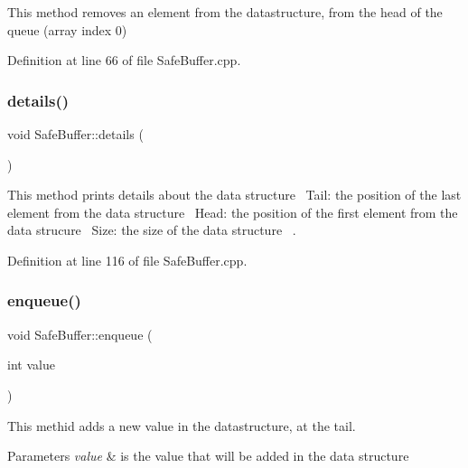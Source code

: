 This method removes an element from the datastructure, from the head of the queue (array index 0) 



Definition at line 66 of file Safe\+Buffer.\+cpp.

\mbox{\label{classSafeBuffer_affaee5f2062b85d8a95379b7e66e1549}} 
\subsubsection{\texorpdfstring{details()}{details()}}
{\footnotesize\ttfamily void Safe\+Buffer\+::details (\begin{DoxyParamCaption}{ }\end{DoxyParamCaption})}



This method prints details about the data structure~\newline
 Tail\+: the position of the last element from the data structure~\newline
 Head\+: the position of the first element from the data strucure~\newline
 Size\+: the size of the data structure~\newline
. 



Definition at line 116 of file Safe\+Buffer.\+cpp.

\mbox{\label{classSafeBuffer_ad9cf3a0c9194cfcb75be17a406dff64e}} 
\subsubsection{\texorpdfstring{enqueue()}{enqueue()}}
{\footnotesize\ttfamily void Safe\+Buffer\+::enqueue (\begin{DoxyParamCaption}\item[{int}]{value }\end{DoxyParamCaption})}



This methid adds a new value in the datastructure, at the tail. 


\begin{DoxyParams}{Parameters}
{\em value} & is the value that will be added in the data structure \\
\hline
\end{DoxyParams}


